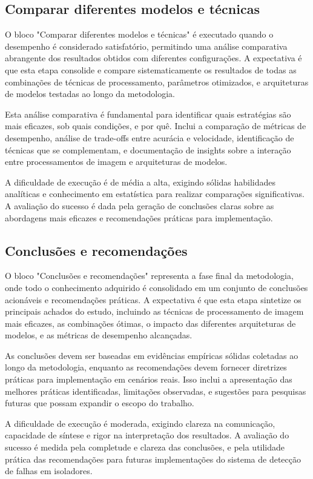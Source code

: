 \subsection{Comparar diferentes modelos e técnicas}
O bloco "Comparar diferentes modelos e técnicas" é executado quando o desempenho é considerado satisfatório, permitindo uma análise comparativa abrangente dos resultados obtidos com diferentes configurações. A expectativa é que esta etapa consolide e compare sistematicamente os resultados de todas as combinações de técnicas de processamento, parâmetros otimizados, e arquiteturas de modelos testadas ao longo da metodologia.

Esta análise comparativa é fundamental para identificar quais estratégias são mais eficazes, sob quais condições, e por quê. Inclui a comparação de métricas de desempenho, análise de trade-offs entre acurácia e velocidade, identificação de técnicas que se complementam, e documentação de insights sobre a interação entre processamentos de imagem e arquiteturas de modelos.

A dificuldade de execução é de média a alta, exigindo sólidas habilidades analíticas e conhecimento em estatística para realizar comparações significativas. A avaliação do sucesso é dada pela geração de conclusões claras sobre as abordagens mais eficazes e recomendações práticas para implementação.

\subsection{Conclusões e recomendações}
O bloco "Conclusões e recomendações" representa a fase final da metodologia, onde todo o conhecimento adquirido é consolidado em um conjunto de conclusões acionáveis e recomendações práticas. A expectativa é que esta etapa sintetize os principais achados do estudo, incluindo as técnicas de processamento de imagem mais eficazes, as combinações ótimas, o impacto das diferentes arquiteturas de modelos, e as métricas de desempenho alcançadas.

As conclusões devem ser baseadas em evidências empíricas sólidas coletadas ao longo da metodologia, enquanto as recomendações devem fornecer diretrizes práticas para implementação em cenários reais. Isso inclui a apresentação das melhores práticas identificadas, limitações observadas, e sugestões para pesquisas futuras que possam expandir o escopo do trabalho.

A dificuldade de execução é moderada, exigindo clareza na comunicação, capacidade de síntese e rigor na interpretação dos resultados. A avaliação do sucesso é medida pela completude e clareza das conclusões, e pela utilidade prática das recomendações para futuras implementações do sistema de detecção de falhas em isoladores.